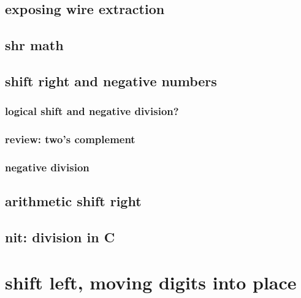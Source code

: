 \subsection{exposing wire extraction}



\subsection{shr math}



\subsection{shift right and negative numbers}

\subsubsection{logical shift and negative division?}



\subsubsection{review: two's complement}



\subsubsection{negative division}



\subsection{arithmetic shift right}





\subsection{nit: division in C}




\section{shift left, moving digits into place}

